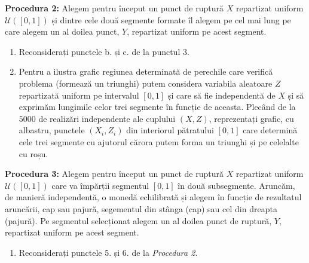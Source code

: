 \documentclass[]{article}
\providecommand{\tightlist}{%
  \setlength{\itemsep}{0pt}\setlength{\parskip}{0pt}}
\begin{document}
\textbf{Procedura 2:} Alegem pentru început un punct de ruptură \(X\)
repartizat uniform \(\mathcal{U}([0,1])\) și dintre cele două segmente
formate îl alegem pe cel mai lung pe care alegem un al doilea punct,
\(Y\), repartizat uniform pe acest segment.

\begin{enumerate}
\def\labelenumi{\arabic{enumi}.}
\setcounter{enumi}{4}
\item
  Reconsiderați punctele b. și c. de la punctul 3.
\item
  Pentru a ilustra grafic regiunea determinată de perechile care
  verifică problema (formează un triunghi) putem considera variabila
  aleatoare \(Z\) repartizată uniform pe intervalul \([0,1]\) și care să
  fie independentă de \(X\) și să exprimăm lungimile celor trei segmente
  în funcție de aceasta. Plecând de la \(5000\) de realizări
  independente ale cuplului \((X,Z)\), reprezentați grafic, cu albastru,
  punctele \((X_i, Z_i)\) din interiorul pătratului \([0,1]\) care
  determină cele trei segmente cu ajutorul cărora putem forma un
  triunghi și pe celelalte cu roșu.
\end{enumerate}

\textbf{Procedura 3:} Alegem pentru început un punct de ruptură \(X\)
repartizat uniform \(\mathcal{U}([0,1])\) care va împărții segmentul
\([0,1]\) în două subsegmente. Aruncăm, de manieră independentă, o
monedă echilibrată și alegem în funcție de rezultatul aruncării, cap sau
pajură, segementul din stânga (cap) sau cel din dreapta (pajură). Pe
segmentul selecționat alegem un al doilea punct de ruptură, \(Y\),
repartizat uniform pe acest segment.

\begin{enumerate}
\def\labelenumi{\arabic{enumi}.}
\setcounter{enumi}{6}
\tightlist
\item
  Reconsiderați punctele 5. și 6. de la \emph{Procedura 2}.
\end{enumerate}
\end{document}
